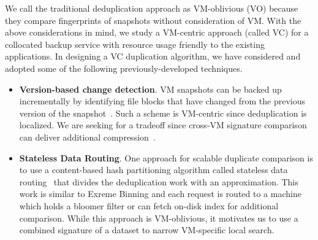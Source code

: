 We call the traditional deduplication approach as   VM-oblivious (VO)
because they compare fingerprints of snapshots without consideration of VM.
With the above  considerations in mind, we study a 
VM-centric approach (called VC)
for a collocated backup service with resource usage friendly
to the existing applications.  
In designing a VC duplication algorithm, we have considered and adopted some of
the following previously-developed techniques.
\begin{itemize}
\item {\bf Version-based change detection}.
VM snapshots can be  backed up  incrementally by identifying file  blocks that have
changed from the previous version of the snapshot~\cite{Clements2009,Vrable2009,TanIPDPS2011}.
Such a scheme  is  VM-centric since deduplication is localized. 
We are seeking for a tradeoff since 
cross-VM  signature comparison can deliver additional compression~\cite{Guo2011,Dong,ExtremeBining}.
\item {\bf Stateless  Data Routing}.
One approach for scalable duplicate comparison is to use a content-based hash
partitioning algorithm called stateless data routing~\cite{Dong20??}
that divides the deduplication work with an approximation. This work 
is similar to Exreme Binning\cite{extreme_binning09} and 
each request is routed  to a machine which holds
a bloomer filter  or can fetch on-disk index for additional comparison.
While this approach is VM-oblivious, it motivates us to  use  a combined signature of a dataset to narrow
VM-specific local search.
 


\end{itemize}
